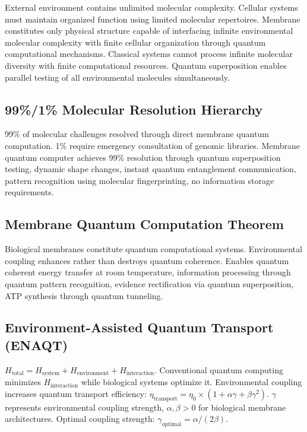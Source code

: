 \documentclass[12pt,a4paper]{article}
\begin{document}
External environment contains unlimited molecular complexity. Cellular systems must maintain organized function using limited molecular repertoires. Membrane constitutes only physical structure capable of interfacing infinite environmental molecular complexity with finite cellular organization through quantum computational mechanisms. Classical systems cannot process infinite molecular diversity with finite computational resources. Quantum superposition enables parallel testing of all environmental molecules simultaneously.

\subsection{99\%/1\% Molecular Resolution Hierarchy}

99\% of molecular challenges resolved through direct membrane quantum computation. 1\% require emergency consultation of genomic libraries. Membrane quantum computer achieves 99\% resolution through quantum superposition testing, dynamic shape changes, instant quantum entanglement communication, pattern recognition using molecular fingerprinting, no information storage requirements.

\subsection{Membrane Quantum Computation Theorem}

Biological membranes constitute quantum computational systems. Environmental coupling enhances rather than destroys quantum coherence. Enables quantum coherent energy transfer at room temperature, information processing through quantum pattern recognition, evidence rectification via quantum superposition, ATP synthesis through quantum tunneling.

\subsection{Environment-Assisted Quantum Transport (ENAQT)}

$H_{\text{total}} = H_{\text{system}} + H_{\text{environment}} + H_{\text{interaction}}$. Conventional quantum computing minimizes $H_{\text{interaction}}$ while biological systems optimize it. Environmental coupling increases quantum transport efficiency: $\eta_{\text{transport}} = \eta_0 \times (1 + \alpha\gamma + \beta\gamma^2)$. $\gamma$ represents environmental coupling strength, $\alpha, \beta > 0$ for biological membrane architectures. Optimal coupling strength: $\gamma_{\text{optimal}} = \alpha/(2\beta)$.
\end{document}
